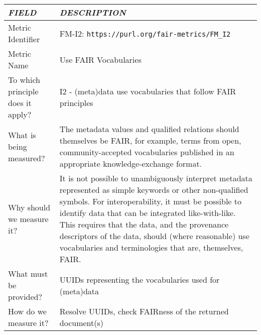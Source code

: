\documentclass[english]{article}
\begin{document}
\begin{longtable}{|p{5cm}|p{9cm}|}


\hline
\emph{FIELD} & \emph{DESCRIPTION} \\
\hline
Metric Identifier &   FM-I2: \verb"https://purl.org/fair-metrics/FM_I2"
\\


\hline
Metric Name &   


Use FAIR Vocabularies


 \\



\hline
To which principle does it apply? &   




I2 - (meta)data use vocabularies that follow FAIR principles

\\



\hline
What is being measured? & 




The metadata values and qualified relations should themselves be FAIR, for example, terms from open, community-accepted vocabularies published in an appropriate knowledge-exchange format.


\\



\hline
Why should we measure it? & 





It is not possible to unambiguously interpret metadata represented as simple keywords or other non-qualified symbols.  For interoperability, it must be possible to identify data that can be integrated like-with-like.  This requires that the data, and the provenance descriptors of the data, should (where reasonable) use vocabularies and terminologies that are, themselves, FAIR.
  
\\



\hline
What must be provided? &  


UUIDs representing the vocabularies used for (meta)data 


\\



\hline
How do we measure it? &  


Resolve UUIDs, check FAIRness of the returned document(s)



\end{longtable}
\end{document}
